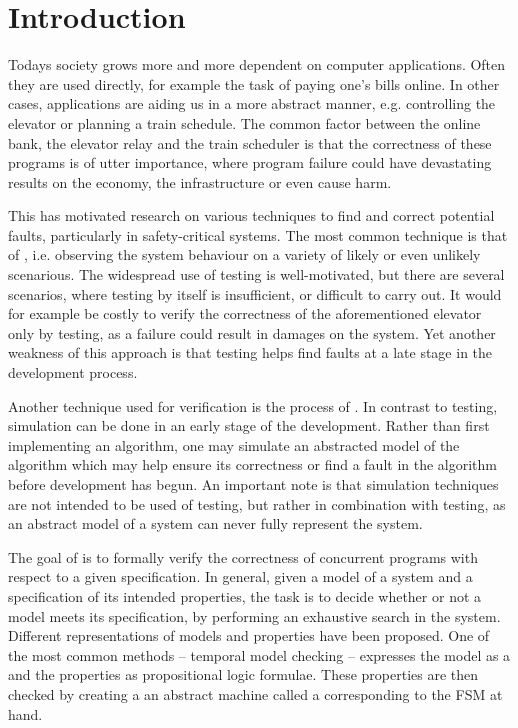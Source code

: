 \newpage
\section{Introduction}
Todays society grows more and more dependent on computer applications. Often they are used directly, for example the task of paying one's bills online. In other cases, applications are aiding us in a more abstract manner, e.g. controlling the elevator or planning a train schedule. The common factor between the online bank, the elevator relay and the train scheduler is that the correctness of these programs is of utter importance, where program failure could have devastating results on the economy, the infrastructure or even cause harm.

This has motivated research on various techniques to find and correct potential faults, particularly in safety-critical systems. The most common technique is that of , i.e. observing the system behaviour on a variety of likely or even unlikely scenarious. The widespread use of testing is well-motivated, but there are several scenarios, where testing by itself is insufficient, or difficult to carry out. It would for example be costly to verify the correctness of the aforementioned elevator only by testing, as a failure could result in damages on the system. Yet another weakness of this approach is that testing helps find faults at a late stage in the development process.

Another technique used for verification is the process of . In contrast to testing, simulation can be done in an early stage of the development. Rather than first implementing an algorithm, one may simulate an abstracted model of the algorithm which may help ensure its correctness or find a fault in the algorithm before development has begun. An important note is that simulation techniques are not intended to be used  of testing, but rather in combination with testing, as an abstract model of a system can never fully represent the system.

The goal of  is to formally verify the correctness of concurrent programs with respect to a given specification. %
In general, given a model of a system and a specification of its intended properties, the task is to decide whether or not a model meets its specification, by performing an exhaustive search in the system. Different representations of models and properties have been proposed. One of the most common methods -- temporal model checking -- expresses the model as a  and the properties as propositional logic formulae. These properties are then checked by creating a an abstract machine called a  corresponding to the FSM at hand.

